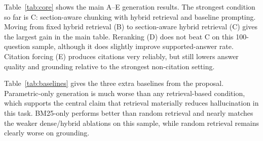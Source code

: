 \documentclass[11pt]{article}
\begin{document}
Table~\ref{tab:core} shows the main A--E generation results. The strongest condition so far is C: section-aware chunking with hybrid retrieval and baseline prompting. Moving from fixed hybrid retrieval (B) to section-aware hybrid retrieval (C) gives the largest gain in the main table. Reranking (D) does not beat C on this 100-question sample, although it does slightly improve supported-answer rate. Citation forcing (E) produces citations very reliably, but still lowers answer quality and grounding relative to the strongest non-citation setting.

\begin{table}[H]
\centering
\small
{}
\caption{Core proposal ablations on a 100-question validation sample. Condition E is the citation-forcing setting, while Condition C is the strongest non-citation condition in this table.}
\label{tab:core}
\end{table}

Table~\ref{tab:baselines} gives the three extra baselines from the proposal. Parametric-only generation is much worse than any retrieval-based condition, which supports the central claim that retrieval materially reduces hallucination in this task. BM25-only performs better than random retrieval and nearly matches the weaker dense/hybrid ablations on this sample, while random retrieval remains clearly worse on grounding.

\begin{table}[H]
\centering
\small
{}
\caption{Additional baselines on the same 100-question validation sample.}
\label{tab:baselines}
\end{table}
\end{document}
